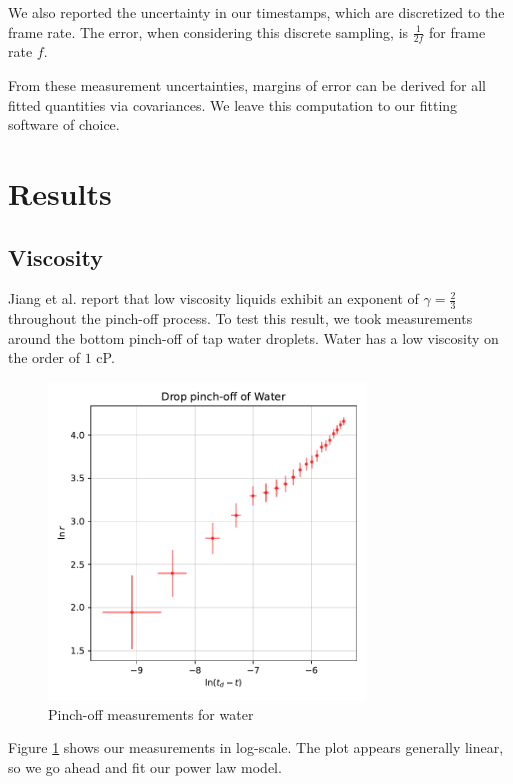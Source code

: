 \documentclass[12pt, letterpaper]{article}
\begin{document}
We also reported the uncertainty in our timestamps, which are discretized to the frame rate. The error, when considering this discrete sampling, is $\frac{1}{2f}$ for frame rate $f$. 

From these measurement uncertainties, margins of error can be derived for all fitted quantities via covariances. We leave this computation to our fitting software of choice. 

\section{Results}

\subsection{Viscosity}

Jiang et al. \cite{jiang} report that low viscosity liquids exhibit an exponent of $\gamma = \frac{2}{3}$ throughout the pinch-off process. To test this result, we took measurements around the bottom pinch-off of tap water droplets. Water has a low viscosity on the order of $1$ cP. 

\begin{figure}[!h]
    \centering
    \includegraphics[width=0.75\textwidth]{experiment3/figures/plots/5water.pdf}
    \caption{Pinch-off measurements for water}
    \label{fig:water1}
\end{figure}

Figure \ref{fig:water1} shows our measurements in log-scale. The plot appears generally linear, so we go ahead and fit our power law model. 
\end{document}
